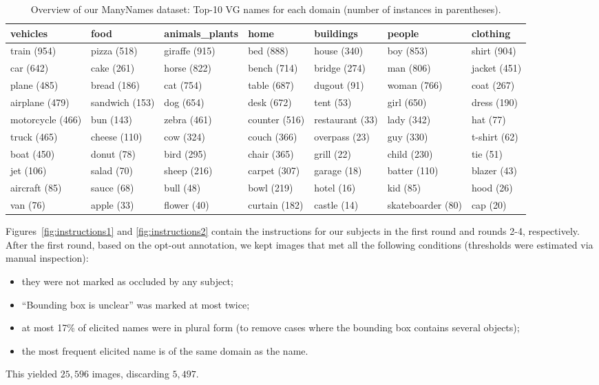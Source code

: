 \begin{table}[htp]
	\small
	\centering
	\begin{tabular}{@{~}l@{~}l@{~}l@{~}l@{~}l@{~}l@{~}l}
		\toprule
		vehicles &            food & animals\_plants &           home &        buildings &             people &      clothing \\
		\midrule
		train (954) &  pizza (518) &  giraffe (915) &  bed (888) &  house (340) &  boy (853) &  shirt (904) \\
		car (642) &  cake (261) &  horse (822) &  bench (714) &  bridge (274) &  man (806) &  jacket (451) \\
		plane (485) &  bread (186) &  cat (754) &  table (687) &  dugout (91) &  woman (766) &  coat (267) \\
		airplane (479) &  sandwich (153) &  dog (654) &  desk (672) &  tent (53) &  girl (650) &  dress (190) \\
		motorcycle (466) &  bun (143) &  zebra (461) &  counter (516) &  restaurant (33) &  lady (342) &  hat (77) \\
		truck (465) &  cheese (110) &  cow (324) &  couch (366) &  overpass (23) &  guy (330) &  t-shirt (62) \\
		boat (450) &  donut (78) &  bird (295) &  chair (365) &  grill (22) &  child (230) &  tie (51) \\
		jet (106) &  salad (70) &  sheep (216) &  carpet (307) &  garage (18) &  batter (110) &  blazer (43) \\
		aircraft (85) &  sauce (68) &  bull (48) &  bowl (219) &  hotel (16) &  kid (85) &  hood (26) \\
		van (76) &  apple (33) &  flower (40) &  curtain (182) &  castle (14) &  skateboarder (80) &  cap (20) \\
		\bottomrule
	\end{tabular}
	\caption{Overview of our ManyNames dataset: Top-10 VG names for each domain (number of instances in parentheses). %
		\label{tab:overview_dataset1}}
\end{table}

Figures~\ref{fig:instructions1} and \ref{fig:instructions2} contain the instructions for our subjects in the first round and rounds 2-4, respectively.
After the first round, based on the opt-out annotation, we kept images that met all the following conditions (thresholds were estimated via manual inspection):
\begin{itemize}
\item they were not marked as occluded by any subject;
\item ``Bounding box is unclear'' was marked at most twice;
\item at most 17\% of elicited names were in plural form (to remove cases where the bounding box contains several objects);
\item the most frequent elicited name is of the same domain as the \vgenome name.
\end{itemize}
This yielded $25,596$ images, discarding $5,497$.

